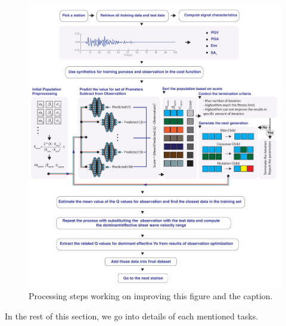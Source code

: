  \begin{figure}[ht]
    \centering
    \includegraphics[width=\textwidth]{figures/pdf/Figure_02.pdf}
    \caption{Processing steps {\color{red} working on improving this figure and the caption.}}
    \label{fig:Figure_1}
\end{figure}

In the rest of this section, we go into details of each mentioned tasks.















